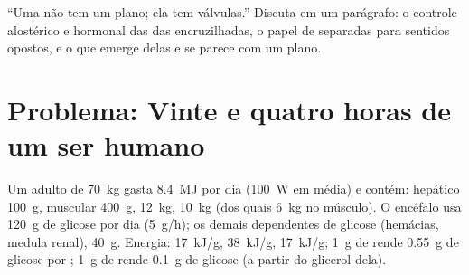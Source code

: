 \begin{exercise}[$\star\star\star$]\label{exo:b1:biosyntheses-integration:12}
``Uma  não tem um plano; ela tem válvulas.'' Discuta em um
parágrafo: o controle alostérico e hormonal das  das
encruzilhadas, o papel de  separadas para sentidos opostos, e o
que emerge delas e se parece com um plano.
\end{exercise}

\section{Problema: Vinte e quatro horas de um ser humano}

\begin{problem}
\label{pb:b1:biosyntheses-integration:1}
Um adulto de \qty{70}{kg} gasta \qty{8.4}{MJ} por dia (\qty{100}{W} em
média) e contém:  hepático \qty{100}{g},  muscular
\qty{400}{g},  \qty{12}{kg},  \qty{10}{kg} (dos quais
\qty{6}{kg} no músculo). O encéfalo usa \qty{120}{g} de glicose por dia
(\qty{5}{g/h}); os demais  dependentes de glicose (hemácias,
medula renal), \qty{40}{g}. Energia:  \qty{17}{kJ/g}, 
\qty{38}{kJ/g},  \qty{17}{kJ/g}; \qty{1}{g} de  rende
\qty{0.55}{g} de glicose por ; \qty{1}{g} de  rende
\qty{0.1}{g} de glicose (a partir do glicerol dela).


\end{problem}
